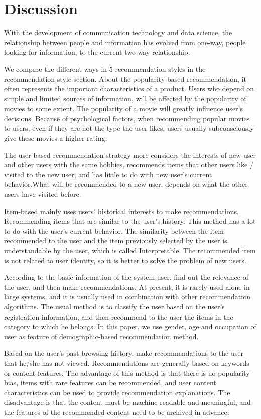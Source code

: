 
\section{Discussion}
\label{ch:discussion}

With the development of communication technology and data science, the relationship between people and information has evolved from one-way, people looking for information, to the current two-way relationship.
\par We compare the different ways in 5 recommendation styles in the recommendation style section. About the popularity-based recommendation, it often represents the important characteristics of a product. Users who depend on simple and limited sources of information, will be affected by the popularity of movies to some extent. The popularity of a movie will greatly influence user's decisions. Because of psychological factors, when recommending popular movies to users, even if they are not the type the user likes, users usually subconsciously give these movies a higher rating.
\par The user-based recommendation strategy more considers the interests of new user and other users with the same hobbies, recommends items that other users like / visited to the new user, and has little to do with new user's current behavior.What will be recommended to a new user, depends on what the other users have visited before. 
\par Item-based mainly uses users' historical interests to make recommendations. Recommending items that are similar to the user's history. This method has a lot to do with the user's current behavior. The similarity between the item recommended to the user and the item previously selected by the user is understandable by the user, which is called Interpretable. The recommended item is not related to user identity, so it is better to solve the problem of new users.
\par According to the basic information of the system user, find out the relevance of the user, and then make recommendations. At present, it is rarely used alone in large systems, and it is usually used in combination with other recommendation algorithms. The usual method is to classify the user based on the user's registration information, and then recommend to the user the items in the category to which he belongs. In this paper, we use gender, age and occupation of user as feature of demographic-based recommendation method.
\par Based on the user's past browsing history, make recommendations to the user that he/she has not viewed. Recommendations are generally based on keywords or content features. The advantage of this method is that there is no popularity bias, items with rare features can be recommended, and user content characteristics can be used to provide recommendation explanations. The disadvantage is that the content must be machine-readable and meaningful, and the features of the recommended content need to be archived in advance.
